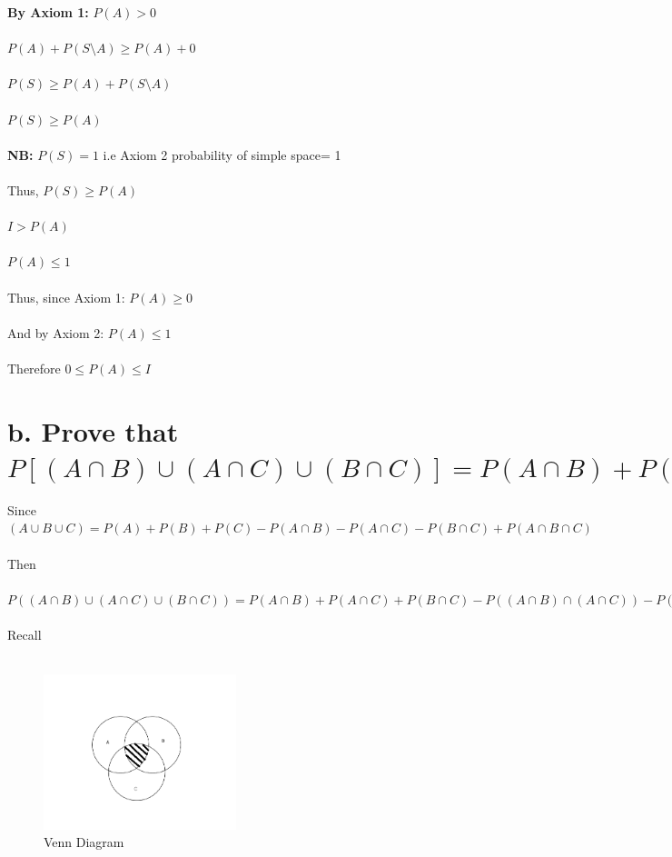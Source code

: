 \documentclass{article}
\begin{document}
\textbf{By Axiom 1:} $P(A) > 0$ \\ \\
$P(A) + P(S \setminus A) \geq P(A) + 0$
\\ \\
$P(S) \geq P(A) + P(S \setminus A)$
\\ \\
$P(S) \geq P(A)$
\\ \\
\textbf{NB:} $P(S) = 1$ { i.e Axiom 2 {probability of simple space= 1}}
\\ \\
Thus, $P(S) \geq P(A)$
\\ \\ 
$I > P(A)$ 
\\ \\
$P(A) \leq 1$
\\ \\ 
Thus, since Axiom 1: $P(A) \geq 0$ 
\\ \\
And by Axiom 2: $P(A) \leq 1$ 
\\ \\
Therefore $0 \leq P(A) \leq I$\\

\newpage
\section*{b. Prove that $P[(A \cap B) \cup (A \cap C) \cup (B \cap C)] = P(A \cap B) + P(A \cap C) + P(B \cap C) - 2P(A \cap B \cap C)$}

Since $(A \cup B \cup C) = P(A) + P(B) + P(C) - P(A \cap B) - P(A \cap C) - P(B \cap C) + P(A \cap B \cap C)$
\\ \\
Then
\\ \\ 
$P((A \cap B) \cup (A \cap C) \cup (B \cap C)) = P(A \cap B) + P(A \cap C) + P(B \cap C) - P((A \cap B) \cap (A \cap C)) - P((A \cap B) \cap (B \cap C)) - P(A \cap C \cap B \cap C) + P((A \cap B) \cap (A \cap C) \cap (B \cap C))$
\\ \\

Recall
\\ \\ 

\begin{figure}[H]
    \centering
    \includegraphics[width=0.5\textwidth]{latexvenn.png}
    \caption{Venn Diagram}
    \label{fig:my_label}
\end{figure}
\end{document}
